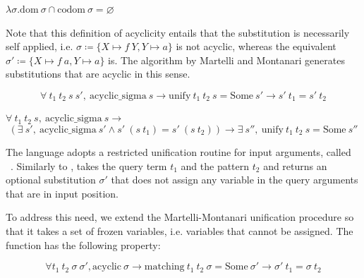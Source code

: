 \begin{definition}[acyclic]
  $\lambda \sigma. \mathrm{dom}\ \sigma \cap \mathrm{codom}\ \sigma = \varnothing$
\end{definition}

Note that this definition of acyclicity entails that the substitution is
necessarily self applied, i.e. $\sigma \coloneq \{ X \mapsto f~Y, Y \mapsto a\}$
is not acyclic, whereas the equivalent $\sigma' \coloneq \{ X \mapsto f~a, Y \mapsto a\}$
is.
The algorithm by Martelli and Montanari generates substitutions that
are acyclic in this sense.

% 

\begin{lemma}\label{th:unifycorrect}%
$$\forall\ t_1\ t_2\ s\ s' ,\ \mathrm{acyclic\_sigma}\ s \to \mathrm{unify}\ t_1\ t_2\ s = \mathrm{Some}\ s' \to s'\ t_1 = s'\ t_2 $$
\end{lemma}

% 
\begin{lemma}\label{th:unifycomplete} $\forall\ t_1\ t_2\ s ,\ \mathrm{acyclic\_sigma}\ s \to$
$$( \exists\ s' ,\ \mathrm{acyclic\_sigma}\ s' \land s'\ ( s\ t_1 ) = s'\ ( s\ t_2 ) ) \to \exists\ s'' ,\ \mathrm{unify}\ t_1\ t_2\ s = \mathrm{Some}\ s''$$
\end{lemma}

The \elpi language adopts a
restricted unification routine for input arguments, called
\matching~\cite{ait1991-wam,zhou2012}. Similarly to \unify, \matching takes the
query term $t_1$ and the pattern $t_2$ and returns an optional substitution
$\sigma'$ that does not assign any variable in the query arguments that
are in input position.

To address this need, we extend the Martelli-Montanari unification
procedure so that it takes a set of frozen variables, i.e. variables that
cannot be assigned. The function \matching has the following property:

% 
\begin{lemma}\label{um}\label{th:matchingdisj}
  $$\forall t_1\ t_2\ \sigma\ \sigma', \mathrm{acyclic}\ \sigma \to \mathrm{matching}\ t_1\ t_2\ \sigma = \mathrm{Some}\ \sigma' \to \sigma'\ t_1 = \sigma\ t_2$$
\end{lemma}

